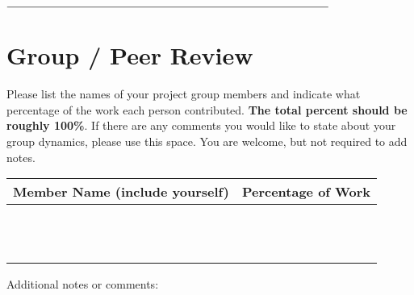 \documentclass[11pt]{article}
\begin{document}
\vspace{1cm}
\newpage



 $\rule{10cm}{0.15mm}$

\section*{Group / Peer Review}

Please list the names of your project group members and indicate what percentage of the work each person contributed. {\bf The total percent should be roughly 100\%}. If there are any comments you would like to state about your group dynamics, please use this space.  You are welcome, but not required to add notes.



\vspace{2cm}

\begin{table}[ht!]
\centering
\begin{tabular}{l | l}
\toprule
Member Name (include yourself) & Percentage of Work \\
\midrule \\
            &                    \\ \midrule \\
            &                    \\ \midrule \\
            &                    \\ \midrule \\
            &                    \\ \midrule \\
            &                    \\ \midrule \\
            &                    \\ \midrule 
\bottomrule 
\end{tabular}
\end{table}


\vspace{2cm}

Additional notes or comments: 

\clearpage
\end{document}
